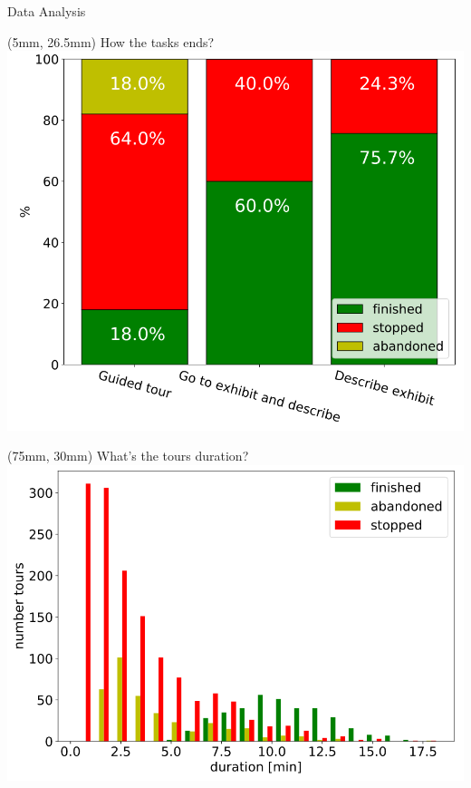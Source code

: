 \documentclass[english,svgnames,notes=hide,14pt]{beamer}
\begin{document}
\begin{frame}[shrink=58]{Data Analysis}
    \begin{textblock*}{4.4cm}(5mm, 26.5mm)
        \centering
        {\footnotesize How the tasks ends?}\\
        \includegraphics[width=\linewidth]{imgs/tasks_fate.png}
    \end{textblock*}
    \begin{textblock*}{5cm}(75mm, 30mm)
        \centering
        {\footnotesize What's the tours duration?}\\
        \includegraphics[width=\linewidth]{imgs/tours_duration.png}
    \end{textblock*}
\end{frame}
\end{document}
